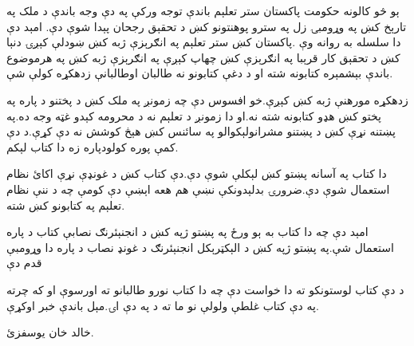 ېو څو کالونه حکومت پاکستان ستر تعلېم باندې توجه ورکې په دې وجه باندې د ملک په تارېخ کښ په وړومبۍ زل په سترو پوهنتونو کښ د تحقېق رجحان پېدا شوې دې.  امېد دې دا سلسله به روانه وې .پاکستان کښ ستر تعلېم په انګرېزې ژبه کښ ښودلې کېږۍ دنېا کښ د تحقېق کار قرېبا په انګرېزې کښ چهاپ کېږې په انګرېزې ژبه کښ په هرموضوع باندې بېشمېره کتابونه شته او د دغې کتابونو نه طالبان اوطالبانې زدهکړه کولې شې.

زدهکړه مورهنې ژبه کښ کېږې.خو افسوس دې چه زمونږ په ملک کښ د پختنو د پاره په پختو کښ هډو کتابونه شته نه.او دا زمونږ د تعلېم نه د محرومه کېدو غټه وجه ده.په پښتنه نړې کښ د پښتنو مشرانولېکوالو په سائنس کښ هېڅ کوشش نه دې کړې.د دې کمې پوره کولودپاره زه دا کتاب لېکم.

 دا کتاب په آسانه پښتو کښ لېکلې شوې دې.دې کتاب کښ د غونډې نړې اکائ نظام استعمال شوې دې.ضرورۍ بدلېدونکې نښې هم هعه اېښې دې کومې چه د ننې نظام تعلېم په کتابونو کښ شته.

امېد دې چه دا کتاب به ېو ورځ په پښتو ژپه کښ د انجنېئرنګ نصابې کتاب د پاره استعمال شې.په پښتو ژپه کښ د الېکټرېکل انجنېئرنګ د غونډ نصاب د پاره دا وړومبې قدم دې

د دې کتاب لوستونکو ته دا خواست دې چه دا کتاب نورو طالبانو ته اورسوې او که چرته په دې کتاب غلطې ولولې نو ما ته د په دې اۍ.مېل باندې خبر اوکړې. 

خالد خان يوسفزئ.








